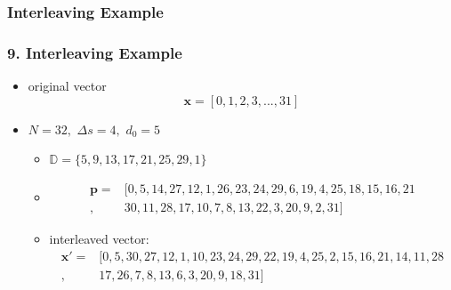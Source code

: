 \documentclass{beamer}  %
\begin{document}
\begin{frame}
\subsubsection{Interleaving Example }
\frametitle{9. Interleaving Example}
\begin{example}
\begin{itemize}

\item original vector $$\mathbf{x}=[0, 1, 2, 3,...,31]$$
\setlength\itemsep{2em}
\item $N=32, \,\, \Delta s =4, \,\, d_0=5$ 
\begin{itemize}
\item $\mathbb{D}=\{5, 9, 13, 17, 21, 25, 29, 1\}$

\item 
\begin{equation*}
\begin{split}
\mathbf{p}= &[ 0, 5, 14, 27, 12, 1, 26, 23, 24, 29, 6, 19, 4, 25, 18, 15, 16, 21\\,
 &30, 11, 28, 17, 10, 7, 8, 13, 22, 3, 20, 9, 2, 31]
\end{split}
\end{equation*}
 \item interleaved vector:
\begin{equation*}
\begin{split}
\mathbf{x}'=&[0,5,30,27,12,1,10,23,24,29,22,19, 4, 25 ,2, 15,16, 21, 14, 11, 28\\,&17,
  26, 7, 8, 13, 6, 3, 20, 9, 18, 31]
\end{split}
\end{equation*}
\end{itemize}



\end {itemize}
\end{example}
\end{frame}
\end{document}
